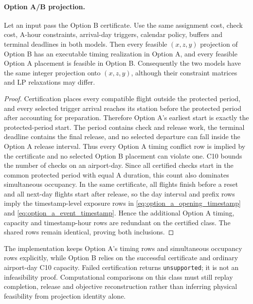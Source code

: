 \paragraph{Option A/B projection.}

\begin{proposition}
  \label{prop:option_ab_projection}
  Let an input pass the Option B certificate. Use the same assignment cost,
  check cost, A-hour constraints, arrival-day triggers, calendar policy,
  buffers and terminal deadlines in both models. Then every feasible
  $(x,z,y)$ projection of Option B has an executable timing realization in
  Option A, and every feasible Option A placement is feasible in Option B.
  Consequently the two models have the same integer projection onto
  $(x,z,y)$, although their constraint matrices and LP relaxations may differ.
\end{proposition}

\begin{proof}
  Certification places every compatible flight outside the protected period,
  and every selected trigger arrival reaches its station before the protected
  period after accounting for preparation. Therefore Option A's earliest
  start is exactly the protected-period start. The period contains check and
  release work, the terminal deadline contains the final release, and no
  selected departure can fall inside the Option A release interval. Thus every
  Option A timing conflict row is implied by the certificate and no selected
  Option B placement can violate one. C10 bounds the number of checks on an
  airport-day. Since all certified checks start in the common protected period
  with equal A duration, this count also dominates simultaneous occupancy.
  In the same certificate, all flights finish before a reset and all next-day
  flights start after release, so the day interval and prefix rows imply the
  timestamp-level exposure rows in \eqref{eq:option_a_opening_timestamp} and
  \eqref{eq:option_a_event_timestamp}. Hence the additional Option A timing,
  capacity and timestamp-hour rows are redundant on the certified class. The
  shared rows remain identical, proving both inclusions.
\end{proof}

The implementation keeps Option A's timing rows and simultaneous occupancy
rows explicitly, while Option B relies on the successful certificate and
ordinary airport-day C10 capacity. Failed certification returns
\texttt{unsupported}; it is not an infeasibility proof. Computational
comparisons on this class must still replay completion, release and objective
reconstruction rather than inferring physical feasibility from projection
identity alone.

